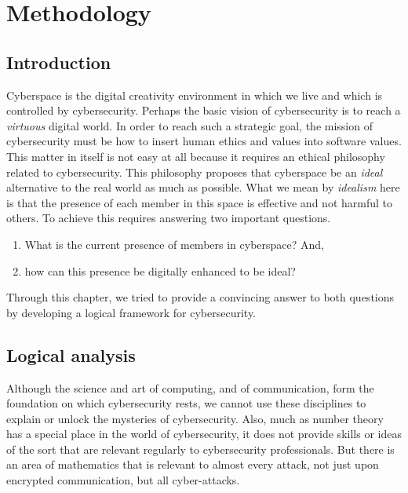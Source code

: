 \chapter{Methodology}
\section{Introduction}
Cyberspace is the digital creativity environment in which we live and
which is controlled by cybersecurity.  Perhaps the basic vision of
cybersecurity is to reach a \emph{virtuous} digital world.  In order to
reach such a strategic goal, the mission of cybersecurity must be how
to insert human ethics and values into software values.  This matter
in itself is not easy at all because it requires an ethical philosophy
related to cybersecurity.  This philosophy proposes that cyberspace
be an \emph{ideal} alternative to the real world as much as possible.
What we mean by \emph{idealism} here is that the presence of each member
in this space is effective and not harmful to others.  To achieve this
requires answering two important questions.

\begin{enumerate}
\item What is the current presence of members in cyberspace? And,
\item how can this presence be digitally enhanced to be ideal?
\end{enumerate}

Through this chapter, we tried to provide a convincing answer to both
questions by developing a  logical framework for cybersecurity. 



\section{Logical analysis}
Although the science and art of computing, and of communication, form the foundation on which cybersecurity rests, we cannot use these disciplines to explain or unlock the mysteries of cybersecurity. Also, much as number theory has a special place in the world of cybersecurity, it does not provide skills or ideas of the sort that are relevant regularly to cybersecurity professionals. But there is an area of mathematics that is relevant to almost every attack, not just upon encrypted communication, but all cyber-attacks. 

